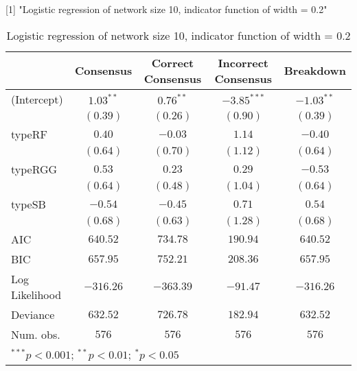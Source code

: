 [1] "Logistic regression of network size 10, indicator function of width = 0.2"

\begin{table}
\begin{center}
\begin{tabular}{l c c c c}
\toprule
 & Consensus & Correct Consensus & Incorrect Consensus & Breakdown \\
\midrule
(Intercept)    & $1.03^{**}$ & $0.76^{**}$ & $-3.85^{***}$ & $-1.03^{**}$ \\
               & $(0.39)$    & $(0.26)$    & $(0.90)$      & $(0.39)$     \\
typeRF         & $0.40$      & $-0.03$     & $1.14$        & $-0.40$      \\
               & $(0.64)$    & $(0.70)$    & $(1.12)$      & $(0.64)$     \\
typeRGG        & $0.53$      & $0.23$      & $0.29$        & $-0.53$      \\
               & $(0.64)$    & $(0.48)$    & $(1.04)$      & $(0.64)$     \\
typeSB         & $-0.54$     & $-0.45$     & $0.71$        & $0.54$       \\
               & $(0.68)$    & $(0.63)$    & $(1.28)$      & $(0.68)$     \\
\midrule
AIC            & $640.52$    & $734.78$    & $190.94$      & $640.52$     \\
BIC            & $657.95$    & $752.21$    & $208.36$      & $657.95$     \\
Log Likelihood & $-316.26$   & $-363.39$   & $-91.47$      & $-316.26$    \\
Deviance       & $632.52$    & $726.78$    & $182.94$      & $632.52$     \\
Num. obs.      & $576$       & $576$       & $576$         & $576$        \\
\bottomrule
\multicolumn{5}{l}{\scriptsize{$^{***}p<0.001$; $^{**}p<0.01$; $^{*}p<0.05$}}
\end{tabular}
\caption{Logistic regression of network size 10, indicator function of width = 0.2}
\label{table:coefficients}
\end{center}
\end{table}
